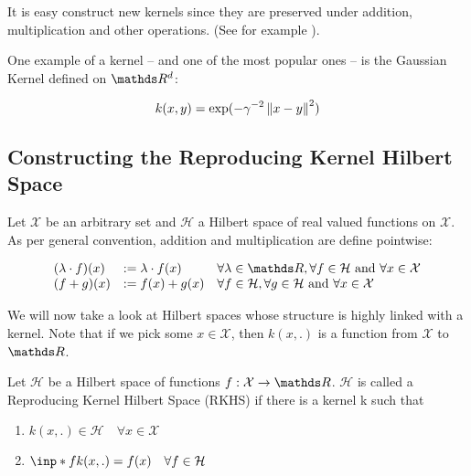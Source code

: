 It is easy construct new kernels since they are preserved under addition, multiplication and other operations. 
(See for example \cite{GrettonNotes}).

One example of a kernel -- and one of the most popular ones -- is the Gaussian Kernel defined on $\R^d$:

$$
    k(x, y) = \exp (-\gamma^{-2}\left\lVert x - y\right\rVert^2)
$$

\subsection{Constructing the Reproducing Kernel Hilbert Space}

Let $\mathcal{X}$ be an arbitrary set and $\mathcal{H}$ a Hilbert space of real valued functions
on $\mathcal{X}$. As per general convention, addition and multiplication are define pointwise:

\begin{equation}
    \begin{array}{lll}
    (\lambda \cdot f)(x) & :=\lambda \cdot f(x) & \forall \lambda \in \R, \forall f \in \mathcal{H} \text { and } \forall x \in \mathcal{X} \\
    (f+g)(x) & :=f(x)+g(x) & \forall f \in \mathcal{H}, \forall g \in \mathcal{H} \text { and } \forall x \in \mathcal{X}
    \end{array}
\end{equation}





We will now take a look at Hilbert spaces whose structure is highly linked with a kernel. 
Note that if we pick some $x \in \mathcal{X}$, then $k(x, .)$ is a function from $\mathcal{X}$ to $\R$.

\begin{definition}
    Let $\mathcal{H}$ be a Hilbert space of functions $f: \mathcal{X} \rightarrow \R$. 
    $\mathcal{H}$ is called a Reproducing Kernel Hilbert Space (RKHS) if there is a kernel k such that

    \begin{enumerate}
        \item $ k(x, .) \in \mathcal{H} \quad \forall x \in \mathcal{X}$
        \item $ \inp*{f}{k(x, .)} = f(x) \quad \forall f \in \mathcal{H}$
    \end{enumerate}

\end{definition}

